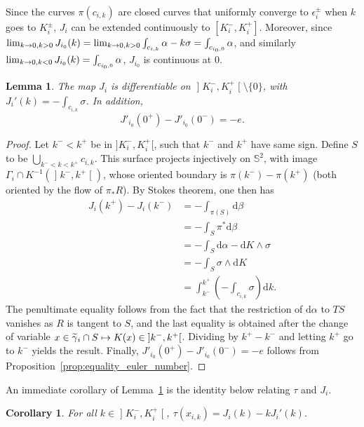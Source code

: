 \documentclass[10pt,a4paper]{amsart}
\newcommand{\bbS}{\mathbb{S}}
\newcommand{\rmd}{\mathrm{d}}
\renewcommand*{\to}{\mathchoice{\longrightarrow}{\rightarrow}{\rightarrow}{\rightarrow}}
\let\oldmapsto\mapsto
\renewcommand*{\mapsto}{\mathchoice{\longmapsto}{\oldmapsto}{\oldmapsto}{\oldmapsto}}
\let\oldtilde\tilde
\renewcommand*{\tilde}[1]{\mathchoice{\widetilde{#1}}{\widetilde{#1}}{\oldtilde{#1}}{\oldtilde{#1}}}
\newtheorem{lemm}[theo]{Lemma}
\newtheorem{coro}[theo]{Corollary}
\theoremstyle{definition}\newtheorem{defi}[theo]{Definition}
\begin{document}
Since the curves $\pi(c_{i,k})$ are closed curves that uniformly converge to $\epsilon_i^\pm$ when $k$ goes to $K_i^\pm$, $J_i$ can be extended continuously to $[K^-_i, K^+_i]$. Moreover, since $\lim_{k \to 0, k >  0} J_{i_0}(k)= \lim_{k \to 0, k > 0} \int_{c_{i,k}} \alpha - k \sigma = \int_{c_{i_0,0}} \alpha$, and similarly $\lim_{k \to 0, k < 0} J_{i_0}(k) = \int_{c_{i_0,0}} \alpha$, $J_{i_0}$ is continuous at $0$.

\begin{lemm}\label{lemma:derivative_J} 
The map $J_i$ is differentiable on $\mathopen{]}K_i^-, K_i^+\mathclose{[}\setminus \{0\}$, with $J_i'(k) = -\int_{c_{i,k}} \sigma$. In addition,
\[
J'_{i_0}(0^+)-J'_{i_0}(0^-) = -e.
\]
\end{lemm}

\begin{proof}
Let $k^- < k^+$ be in $]K_i^-, K_i^+[$, such that $k^-$ and $k^+$ have same sign. Define $S$ to be $\bigcup_{k^- < k < k^+}c_{i,k}$. This surface projects injectively on $\bbS^2$, with image\pagebreak{} $\Gamma_i \cap K^{-1}(\mathopen{]}k^-,k^+\mathclose{[})$, whose oriented boundary is $\pi(k^-) - \pi(k^+)$ (both oriented by the flow of $\pi_* R$). By Stokes theorem, one then has
\begin{align*}
J_i(k^+)-J_i(k^-) &= -\int_{\pi(S)} \rmd \beta \\
&= -\int_{S} \pi^*\rmd \beta \\
&= -\int_{S} \rmd \alpha - \rmd K \wedge \sigma \\
&= -\int_{S} \sigma \wedge \rmd K \\
&= \int_{k^-}^{k^+}\left(-\int_{c_{i,k}} \sigma \right) \rmd k.
\end{align*}
The penultimate equality follows from the fact that the restriction of $\rmd  \alpha$ to $TS$ vanishes as $R$ is tangent to $S$, and the last equality is obtained after the change of variable $x \in \tilde \gamma_i \cap S \mapsto K(x) \in\mathopen{]}k^-, k^+\mathclose{[}$. Dividing by $k^+ - k^-$ and letting $k^+$ go to $k^-$ yields the result. Finally, $J'_{i_0}(0^+)-J'_{i_0}(0^-) = -e$ follows from Proposition~\ref{prop:equality_euler_number}.
\end{proof}

An immediate corollary of Lemma~\ref{lemma:derivative_J} is the identity below relating $\tau$ and $J_i$.

\begin{coro}\label{coro:identity_tau}
For all $k \in\mathopen{]}K_i^-, K_i^+\mathclose{[}$, $\tau(x_{i,k}) = J_i(k) - k J_i'(k)$.
\end{coro}
\end{document}
